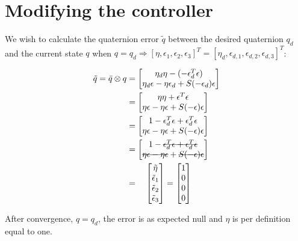 \section{Modifying the controller}

We wish to calculate the quaternion error $\tilde{q}$ between the desired quaternion $q_d$ and the current state $q$ when $q = q_d \Rightarrow [\eta,\epsilon_1,\epsilon_2,\epsilon_3]^T = [\eta_d,\epsilon_{d,1},\epsilon_{d,2},\epsilon_{d,3}]^T$:

\begin{equations}
    \begin{align*}
        \tilde{q} = \bar{q} \otimes q &=
        \begin{bmatrix}
            \eta_d\eta - (-\epsilon_d^T\epsilon)\\
            \eta_d\epsilon - \eta\epsilon_d + S(-\epsilon_d)\epsilon
        \end{bmatrix}\\
        &=
        \begin{bmatrix}
            \eta\eta + \epsilon^T\epsilon\\
            \eta\epsilon - \eta\epsilon + S(-\epsilon)\epsilon
        \end{bmatrix}\\
        &=
        \begin{bmatrix}
            1 - \epsilon_d^T\epsilon + \epsilon_d^T\epsilon\\
            \eta\epsilon - \eta\epsilon + S(-\epsilon)\epsilon
        \end{bmatrix}\\
        &=
        \begin{bmatrix}
            1 - \text{\sout{$\epsilon_d^T\epsilon + \epsilon_d^T\epsilon$}}\\
            \text{\sout{$\eta\epsilon - \eta\epsilon$}} + \text{\sout{$S(-\epsilon)\epsilon$}}
        \end{bmatrix}\\
        &=\quad
        \begin{bmatrix}
            \tilde\eta\\
            \tilde\epsilon_1\\
            \tilde\epsilon_2\\
            \tilde\epsilon_3\\
        \end{bmatrix}
        =
        \begin{bmatrix}
            1\\
            0\\
            0\\
            0\\
        \end{bmatrix}
    \end{align*}
\end{equations}

After convergence, $q = q_d$, the error is as expected null and $\eta$ is per definition equal to one.

